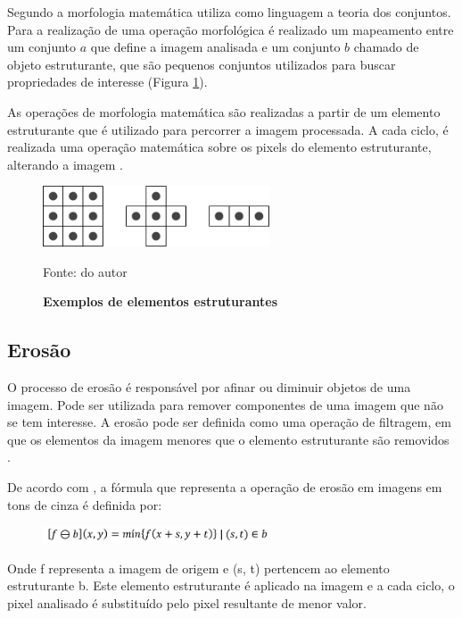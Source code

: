 \documentclass[
	12pt,				%
	oneside,			%
	a4paper,			%
	english,			%
	french,				%
	spanish,			%
	brazil,				%
	]{abntex2}
\begin{document}
Segundo \citet{gonzalesWoods:2008} a morfologia matemática utiliza como linguagem a teoria dos conjuntos. Para a realização de uma operação morfológica é realizado um mapeamento entre um conjunto \(a\) que define a imagem analisada e um conjunto \(b\) chamado de objeto estruturante, que são pequenos conjuntos utilizados para buscar propriedades de interesse (Figura \ref{fig:elementro_estruturante}). 

As operações de morfologia matemática são realizadas a partir de um elemento estruturante que é utilizado para percorrer a imagem processada. A cada ciclo, é realizada uma operação matemática sobre os pixels do elemento estruturante, alterando a imagem \cite{pedriniSchwartz:2008}.

\begin{figure}[ht]
\centering
\caption{\textbf{Exemplos de elementos estruturantes}}
\includegraphics[width=0.6\textwidth]{imagens/elemento_estruturante.png}

Fonte: do autor
\label{fig:elementro_estruturante}
\end{figure}

\subsection{Erosão}
O processo de erosão é responsável por afinar ou diminuir objetos de uma imagem. Pode ser utilizada para remover componentes de uma imagem que não se tem interesse. A erosão pode ser definida como uma operação de filtragem, em que os elementos da imagem menores que o elemento estruturante são removidos \cite{gonzalesWoods:2008}.

De acordo com \citet{pedriniSchwartz:2008}, a fórmula que representa a operação de erosão em imagens em tons de cinza é definida por:

\begin{figure}[ht]
\centering
\includegraphics[width=0.6\textwidth]{imagens/erosao_formula.png}
\end{figure}

Onde f representa a imagem de origem e (s, t) pertencem ao elemento estruturante b. Este elemento estruturante é aplicado na imagem e a cada ciclo, o pixel analisado é substituído pelo pixel resultante de menor valor.
\end{document}
